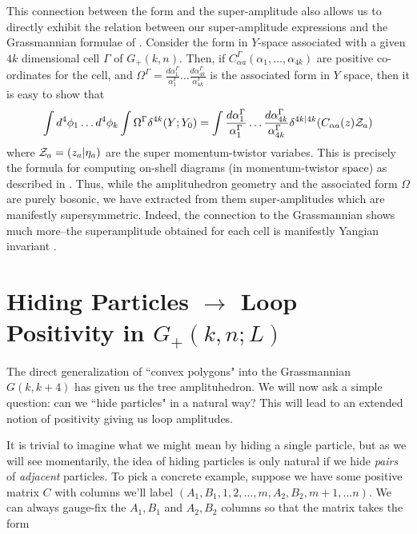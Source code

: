 \documentclass[12pt,nohyper,twosided]{JHEP3}
\newcommand{\be}{\begin{eqnarray}}
\newcommand{\ee}{\end{eqnarray}}
\begin{document}
This connection between the form and the super-amplitude also allows
us to directly exhibit the relation between our super-amplitude
expressions and the Grassmannian formulae of \cite{N4,N6}. Consider
the form in $Y$-space associated with a given $4k$ dimensional cell
$\Gamma$ of $G_+(k,n)$. Then, if $C^\Gamma_{\alpha
a}(\alpha_1,\dots, \alpha_{4k})$ are positive co-ordinates for the
cell, and $\Omega^\Gamma = \frac{d\alpha^\Gamma_1}{\alpha^\Gamma_1}
\dots \frac{d\alpha^\Gamma_{4k}}{\alpha^\Gamma_{4k}}$ is the
associated form in $Y$ space, then it is easy to show that \be \int
d^4 \phi_1 \dots d^4 \phi_k \int \Omega^\Gamma \delta^{4k}(Y;Y_0) =
\int \frac{d\alpha^\Gamma_1}{\alpha^\Gamma_1} \dots
\frac{d\alpha^\Gamma_{4k}}{\alpha^\Gamma_{4k}}
\delta^{4k|4k}(C_{\alpha a}(z) {\cal Z}_a) \ee where ${\cal Z}_a =
(z_a|\eta_a)$ are the super momentum-twistor variabes. This is
precisely the formula for computing on-shell diagrams (in
momentum-twistor space) as described in \cite{N4,LD1,N6}. Thus,
while the amplituhedron geometry and the associated form $\Omega$
are purely bosonic, we have extracted from them super-amplitudes
which are manifestly supersymmetric. Indeed, the connection to the
Grassmannian shows much more--the superamplitude obtained for each
cell is manifestly Yangian invariant \cite{N6}.

\section{Hiding Particles $\to$ Loop Positivity in $G_+(k,n;L)$}
The direct generalization of ``convex polygons" into the
Grassmannian $G(k,k+4)$ has given us the tree amplituhedron. We will
now ask a simple question: can we ``hide particles" in a natural
way? This will lead to an extended notion of positivity giving us
loop amplitudes.

It is trivial to imagine what we might mean by hiding a single
particle, but as we will see momentarily, the idea of hiding
particles is only natural if we hide {\it pairs} of {\it adjacent}
particles. To pick a concrete example, suppose we have some positive
matrix $C$ with columns we'll label $(A_1,B_1, 1, 2, \dots, m, A_2, B_2,
m+1, \dots n)$. We can always gauge-fix the $A_1,B_1$ and $A_2,B_2$ columns
so that the matrix takes the form
\end{document}
